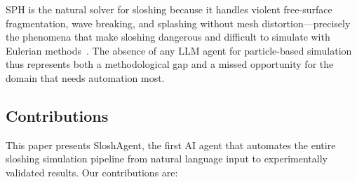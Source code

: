 \documentclass[11pt]{article}
\begin{document}
SPH is the natural solver for sloshing because it handles violent free-surface fragmentation, wave breaking, and splashing without mesh distortion---precisely the phenomena that make sloshing dangerous and difficult to simulate with Eulerian methods~\citep{dominguez2022dualsphysics}. The absence of any LLM agent for particle-based simulation thus represents both a methodological gap and a missed opportunity for the domain that needs automation most.

\subsection{Contributions}

This paper presents SloshAgent, the first AI agent that automates the entire sloshing simulation pipeline from natural language input to experimentally validated results. Our contributions are:
\end{document}
